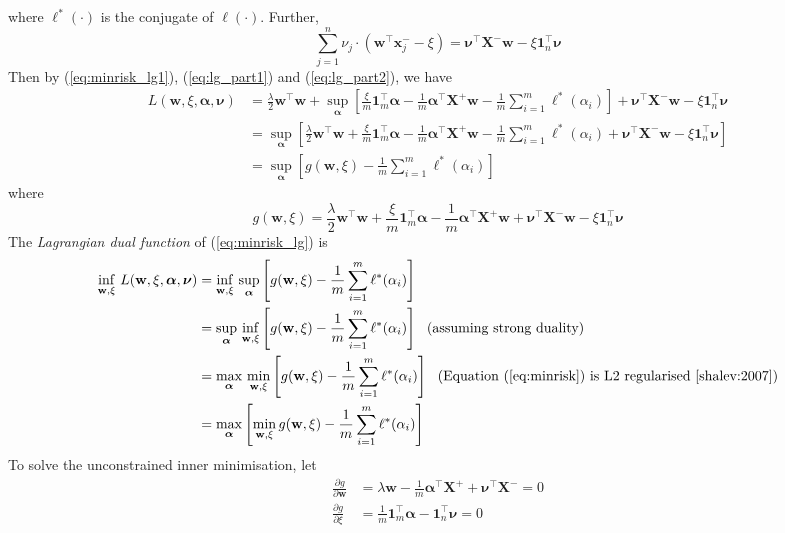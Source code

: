 \documentclass[9pt]{extarticle}
\newcommand{\x}{\mathbf{x}}
\newcommand{\X}{\mathbf{X}}
\newcommand{\1}{\mathbf{1}}
\newcommand{\w}{\mathbf{w}}
\newcommand{\alphabm}{\bm{\alpha}}
\newcommand{\nubm}{\bm{\nu}}
\begin{document}
where $\ell^*(\cdot)$ is the conjugate of $\ell(\cdot)$.
Further, 
\begin{equation}
\label{eq:lg_part2}
\sum_{j=1}^n \nu_j \cdot \left( \w^\top \x_j^- - \xi \right) = \nubm^\top \X^- \w - \xi \1_n^\top \nubm
\end{equation}
Then by (\ref{eq:minrisk_lg1}), (\ref{eq:lg_part1}) and (\ref{eq:lg_part2}), we have
\begin{align*}
L(\w, \xi, \alphabm, \nubm) 
&= \frac{\lambda}{2} \w^\top \w + 
   \sup_{\alphabm} \left[ \frac{\xi}{m} \1_m^\top \alphabm - \frac{1}{m} \alphabm^\top \X^+ \w - \frac{1}{m} \sum_{i=1}^m \ell^*(\alpha_i) \right] +
   \nubm^\top \X^- \w - \xi \1_n^\top \nubm \\
&= \sup_{\alphabm} \left[ 
   \frac{\lambda}{2} \w^\top \w + 
   \frac{\xi}{m} \1_m^\top \alphabm - \frac{1}{m} \alphabm^\top \X^+ \w - \frac{1}{m} \sum_{i=1}^m \ell^*(\alpha_i) +
   \nubm^\top \X^- \w - \xi \1_n^\top \nubm \right] \\
&= \sup_{\alphabm} \left[ g(\w, \xi) - \frac{1}{m} \sum_{i=1}^m \ell^*(\alpha_i) \right]
\end{align*}
where
$$g(\w, \xi) = \frac{\lambda}{2} \w^\top \w + \frac{\xi}{m} \1_m^\top \alphabm - \frac{1}{m} \alphabm^\top \X^+ \w + \nubm^\top \X^- \w - \xi \1_n^\top \nubm$$
The \emph{Lagrangian dual function} of (\ref{eq:minrisk_lg}) is
\begin{equation}
\label{eq:lg_dual_func}
\begin{aligned}
\inf_{\w, \xi} \, L(\w, \xi, \alphabm, \nubm) 
&= \inf_{\w, \xi}  \, \sup_{\alphabm} \left[ g(\w, \xi) - \frac{1}{m} \sum_{i=1}^m \ell^*(\alpha_i) \right] \\
&= \sup_{\alphabm} \, \inf_{\w, \xi} \left[ g(\w, \xi) - \frac{1}{m} \sum_{i=1}^m \ell^*(\alpha_i) \right] ~~ \text{(assuming strong duality)} \\
&= \max_{\alphabm} \, \min_{\w, \xi} \left[ g(\w, \xi) - \frac{1}{m} \sum_{i=1}^m \ell^*(\alpha_i) \right] ~~ \text{(Equation (\ref{eq:minrisk}) is L2 regularised~\cite{shalev:2007})} \\
&= \max_{\alphabm} \left[ \min_{\w, \xi} g(\w, \xi) - \frac{1}{m} \sum_{i=1}^m \ell^*(\alpha_i) \right]
\end{aligned}
\end{equation}
To solve the unconstrained inner minimisation, let
\begin{align*}
\frac{\partial g}{\partial \w}  &= \lambda \w - \frac{1}{m} \alphabm^\top \X^+ + \nubm^\top \X^- = 0 \\
\frac{\partial g}{\partial \xi} &= \frac{1}{m} \1_m^\top \alphabm - \1_n^\top \nubm = 0
\end{align*}
\end{document}
